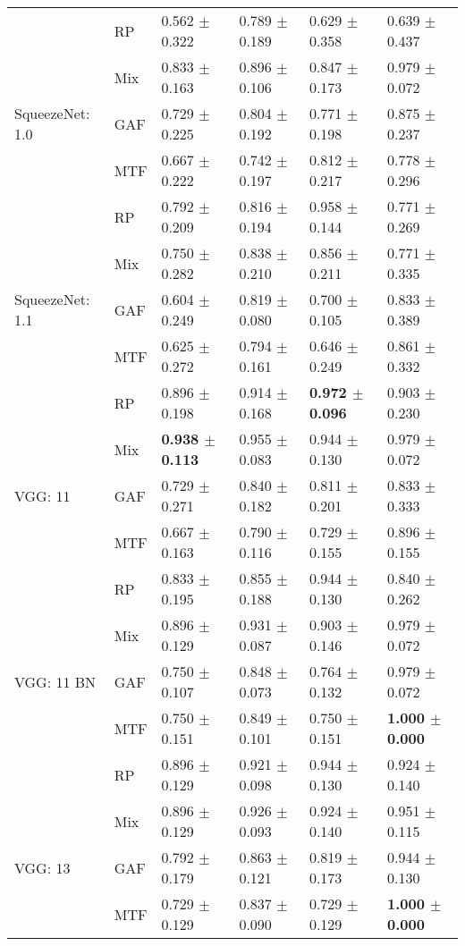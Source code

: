 \begin{longtable}[t]{llllll}
 & RP & 0.562 $\pm$ 0.322 & 0.789 $\pm$ 0.189 & 0.629 $\pm$ 0.358 & 0.639 $\pm$ 0.437 \\
 & Mix & 0.833 $\pm$ 0.163 & 0.896 $\pm$ 0.106 & 0.847 $\pm$ 0.173 & 0.979 $\pm$ 0.072 \\
SqueezeNet: 1.0 & GAF & 0.729 $\pm$ 0.225 & 0.804 $\pm$ 0.192 & 0.771 $\pm$ 0.198 & 0.875 $\pm$ 0.237 \\
 & MTF & 0.667 $\pm$ 0.222 & 0.742 $\pm$ 0.197 & 0.812 $\pm$ 0.217 & 0.778 $\pm$ 0.296 \\
 & RP & 0.792 $\pm$ 0.209 & 0.816 $\pm$ 0.194 & 0.958 $\pm$ 0.144 & 0.771 $\pm$ 0.269 \\
 & Mix & 0.750 $\pm$ 0.282 & 0.838 $\pm$ 0.210 & 0.856 $\pm$ 0.211 & 0.771 $\pm$ 0.335 \\
SqueezeNet: 1.1 & GAF & 0.604 $\pm$ 0.249 & 0.819 $\pm$ 0.080 & 0.700 $\pm$ 0.105 & 0.833 $\pm$ 0.389 \\
 & MTF & 0.625 $\pm$ 0.272 & 0.794 $\pm$ 0.161 & 0.646 $\pm$ 0.249 & 0.861 $\pm$ 0.332 \\
 & RP & 0.896 $\pm$ 0.198 & 0.914 $\pm$ 0.168 & \textbf{0.972 $\pm$ 0.096} & 0.903 $\pm$ 0.230 \\
 & Mix & \textbf{0.938 $\pm$ 0.113} & 0.955 $\pm$ 0.083 & 0.944 $\pm$ 0.130 & 0.979 $\pm$ 0.072 \\
VGG: 11 & GAF & 0.729 $\pm$ 0.271 & 0.840 $\pm$ 0.182 & 0.811 $\pm$ 0.201 & 0.833 $\pm$ 0.333 \\
 & MTF & 0.667 $\pm$ 0.163 & 0.790 $\pm$ 0.116 & 0.729 $\pm$ 0.155 & 0.896 $\pm$ 0.155 \\
 & RP & 0.833 $\pm$ 0.195 & 0.855 $\pm$ 0.188 & 0.944 $\pm$ 0.130 & 0.840 $\pm$ 0.262 \\
 & Mix & 0.896 $\pm$ 0.129 & 0.931 $\pm$ 0.087 & 0.903 $\pm$ 0.146 & 0.979 $\pm$ 0.072 \\
VGG: 11 BN & GAF & 0.750 $\pm$ 0.107 & 0.848 $\pm$ 0.073 & 0.764 $\pm$ 0.132 & 0.979 $\pm$ 0.072 \\
 & MTF & 0.750 $\pm$ 0.151 & 0.849 $\pm$ 0.101 & 0.750 $\pm$ 0.151 & \textbf{1.000 $\pm$ 0.000} \\
 & RP & 0.896 $\pm$ 0.129 & 0.921 $\pm$ 0.098 & 0.944 $\pm$ 0.130 & 0.924 $\pm$ 0.140 \\
 & Mix & 0.896 $\pm$ 0.129 & 0.926 $\pm$ 0.093 & 0.924 $\pm$ 0.140 & 0.951 $\pm$ 0.115 \\
VGG: 13 & GAF & 0.792 $\pm$ 0.179 & 0.863 $\pm$ 0.121 & 0.819 $\pm$ 0.173 & 0.944 $\pm$ 0.130 \\
 & MTF & 0.729 $\pm$ 0.129 & 0.837 $\pm$ 0.090 & 0.729 $\pm$ 0.129 & \textbf{1.000 $\pm$ 0.000} \\

\end{longtable}
